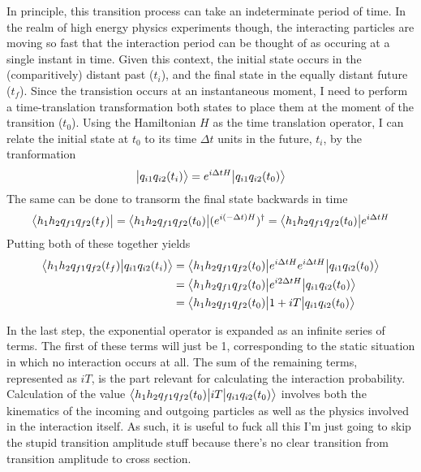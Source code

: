     In principle, this transition process can take an indeterminate period of time.
    In the realm of high energy physics experiments though,
        the interacting particles are moving so fast that the interaction period can be thought of as occuring at a single instant in time.
    Given this context, the initial state occurs in the (comparitively) distant past ($t_i$), and the final state in the equally distant future ($t_f$).
    Since the transistion occurs at an instantaneous moment,
        I need to perform a time-translation transformation both states to place them at the moment of the transition ($t_0$).
    Using the Hamiltonian $H$ as the time translation operator,
        I can relate the initial state at $t_0$ to its time $\Delta t$ units in the future, $t_i$, by the tranformation
    \begin{equation}
        \big| q_{i1} q_{i2} (t_i) \big> = e^{i\Delta tH}\big| q_{i1} q_{i2} (t_0) \big>
    \end{equation}
    The same can be done to transorm the final state backwards in time
    \begin{equation}
        \big< h_1 h_2 q_{f1} q_{f2} (t_f) \big|
        = \big< h_1 h_2 q_{f1} q_{f2} (t_0) \big| (e^{i(-\Delta t)H})^\dag
        = \big< h_1 h_2 q_{f1} q_{f2} (t_0) \big| e^{i\Delta tH}
    \end{equation}
    Putting both of these together yields
    \begin{equation} \begin{split}
        \big<  h_1 h_2 q_{f1} q_{f2} (t_f) \big| q_{i1} q_{i2} (t_i) \big>
        &= \big<  h_1 h_2 q_{f1} q_{f2} (t_0) \big| e^{i\Delta tH} e^{i\Delta tH} \big| q_{i1} q_{i2} (t_0) \big>
        \\&= \big<  h_1 h_2 q_{f1} q_{f2} (t_0) \big| e^{i2\Delta tH} \big| q_{i1} q_{i2} (t_0) \big>
        \\&= \big<  h_1 h_2 q_{f1} q_{f2} (t_0) \big| 1 + iT \big| q_{i1} q_{i2} (t_0) \big>
    \end{split} \end{equation}

    In the last step, the exponential operator is expanded as an infinite series of terms.
    The first of these terms will just be 1, corresponding to the static situation in which no interaction occurs at all.
    The sum of the remaining terms, represented as $iT$, is the part relevant for calculating the interaction probability.
    Calculation of the value $\big<  h_1 h_2 q_{f1} q_{f2} (t_0) \big| iT \big| q_{i1} q_{i2} (t_0) \big>$ involves both
        the kinematics of the incoming and outgoing particles as well as the physics involved in the interaction itself.
    As such, it is useful to fuck all this I'm just going to skip the stupid transition amplitude stuff because
        there's no clear transition from transition amplitude to cross section.




